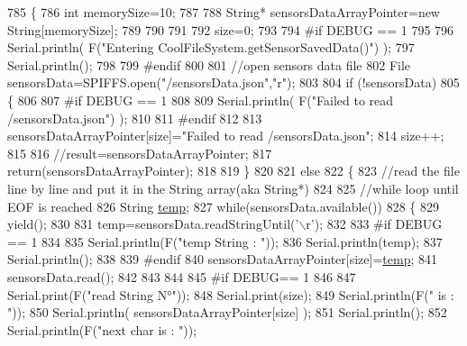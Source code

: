 \begin{DoxyCode}
785 \{
786     \textcolor{keywordtype}{int} memorySize=10;
787     
788     String* sensorsDataArrayPointer=\textcolor{keyword}{new} String[memorySize];
789     
790     
791 
792     size=0;
793 
794 \textcolor{preprocessor}{#if DEBUG == 1 }
795 
796     Serial.println( F(\textcolor{stringliteral}{"Entering CoolFileSystem.getSensorSavedData()"}) );
797     Serial.println();
798 
799 \textcolor{preprocessor}{#endif}
800 
801     \textcolor{comment}{//open sensors data file}
802     File sensorsData=SPIFFS.open(\textcolor{stringliteral}{"/sensorsData.json"},\textcolor{stringliteral}{"r"});
803     
804     \textcolor{keywordflow}{if} (!sensorsData)
805     \{
806 
807 \textcolor{preprocessor}{    #if DEBUG == 1 }
808 
809         Serial.println( F(\textcolor{stringliteral}{"Failed to read /sensorsData.json"}) );
810 
811 \textcolor{preprocessor}{    #endif}
812          
813         sensorsDataArrayPointer[size]=\textcolor{stringliteral}{"Failed to read /sensorsData.json"};
814         size++;
815 
816         \textcolor{comment}{//result=sensorsDataArrayPointer;}
817         \textcolor{keywordflow}{return}(sensorsDataArrayPointer);
818 
819     \}
820 
821     \textcolor{keywordflow}{else}
822     \{
823         \textcolor{comment}{//read the file line by line and put it in the String array(aka String*)        }
824 
825         \textcolor{comment}{//while loop until EOF is reached}
826         String \hyperlink{_irene3000_8h_a5905d48604152cf57aa6bfa087b49173}{temp};
827         \textcolor{keywordflow}{while}(sensorsData.available())
828         \{
829             yield();
830 
831             temp=sensorsData.readStringUntil(\textcolor{charliteral}{'\(\backslash\)r'});
832 
833 \textcolor{preprocessor}{        #if DEBUG == 1}
834 
835             Serial.println(F(\textcolor{stringliteral}{"temp String : "}));
836             Serial.println(temp);
837             Serial.println();
838             
839 \textcolor{preprocessor}{        #endif}
840             sensorsDataArrayPointer[size]=\hyperlink{_irene3000_8h_a5905d48604152cf57aa6bfa087b49173}{temp};
841             sensorsData.read();
842             
843             
844         
845 \textcolor{preprocessor}{        #if DEBUG== 1}
846  
847             Serial.print(F(\textcolor{stringliteral}{"read String N°"}));
848             Serial.print(size);
849             Serial.println(F(\textcolor{stringliteral}{" is : "}));
850             Serial.println( sensorsDataArrayPointer[size] );
851             Serial.println();
852             Serial.println(F(\textcolor{stringliteral}{"next char is : "}));

\end{DoxyCode}

